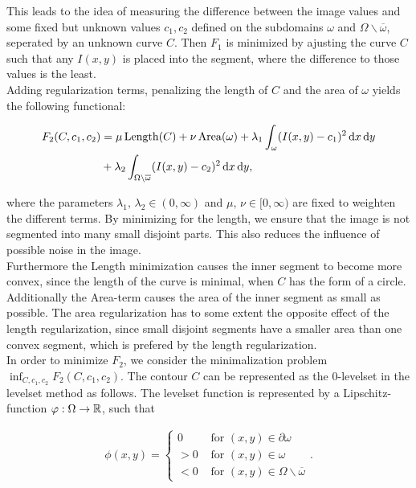 This leads to the idea of measuring the difference between the image values and some fixed but unknown values $c_1,c_2$ defined on the subdomains $\omega$ and $\Omega\backslash \overline{\omega}$, seperated by an unknown curve $C$. Then $F_1$ is minimized by ajusting the curve $C$ such that any $I(x,y)$ is placed into the segment, where the difference to those values is the least.\\

Adding regularization terms, penalizing the length of $C$ and the area of $\omega$ yields the following functional:

\begin{equation}
  \begin{split}
    F_2(C,c_1,c_2) &= \mu\,{\rm Length}(C) + \nu\,{\rm Area}(\omega) + \lambda_1\int_{\omega}(I(x,y)-c_1)^2 \df x \df y\\
    &+ \lambda_2\int_{\Omega\backslash\overline{\omega}} (I(x,y)-c_2)^2 \df x \df y,
  \end{split}\label{F1}
\end{equation}

where the parameters $\lambda_1,\,\lambda_2\in (0,\infty)$ and $\mu,\,\nu\in [0,\infty)$ are fixed to weighten the different terms. By minimizing for the length, we ensure that the image is not segmented into many small disjoint parts. This also reduces the influence of possible noise in the image.\\
Furthermore the Length minimization causes the inner segment to become more convex, since the length of the curve is minimal, when $C$ has the form of a circle.\\
Additionally the Area-term causes the area of the inner segment as small as possible. The area regularization has to some extent the opposite effect of the length regularization, since small disjoint segments have a smaller area than one convex segment, which is prefered by the length regularization.\\

In order to minimize $F_2$, we consider the minimalization problem $\inf_{C,c_1,c_2}F_2(C,c_1,c_2)$. The contour $C$ can be represented as the $0$-levelset in the levelset method as follows. The levelset function is represented by a Lipschitz-function $\varphi:\Omega\to\mathbb R$, such that

\begin{align*}
  \phi(x,y) = 
  \begin{cases}
    0 & \mbox{ for } (x,y) \in \partial\omega\\
    > 0 & \mbox{ for } (x,y) \in \omega\\
    < 0 & \mbox{ for } (x,y) \in \Omega\backslash\overline{\omega}
  \end{cases}.
\end{align*}

